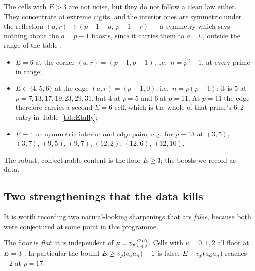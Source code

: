The cells with $E>3$ are not noise, but they do not follow a clean law either. They
concentrate at extreme digits, and the interior ones are symmetric under the reflection
$(a,r)\mapsto(p-1-a,\,p-1-r)$ --- a symmetry which says nothing about the $a=p-1$ boosts,
since it carries them to $a=0$, outside the range of the table :
\begin{itemize}[leftmargin=1.4em]
\item $E=6$ at the corner $(a,r)=(p-1,p-1)$, i.e.\ $n=p^2-1$, at every prime in range;
\item $E\in\{4,5,6\}$ at the edge $(a,r)=(p-1,0)$, i.e.\ $n=p(p-1)$: it is $5$ at
$p=7,13,17,19,23,29,31$, but $4$ at $p=5$ and $6$ at $p=11$. At $p=11$ the edge therefore
carries a second $E=6$ cell, which is the whole of that prime's $6{:}2$ entry in
Table~\ref{tab:Etally};
\item $E=4$ on symmetric interior and edge pairs, e.g.\ for $p=13$ at
$(3,5)$, $(3,7)$, $(9,5)$, $(9,7)$, $(12,2)$, $(12,6)$, $(12,10)$.
\end{itemize}
The robust, conjecturable content is the floor $E\ge3$; the boosts we record as data.

\subsection{Two strengthenings that the data kills}

It is worth recording two natural-looking sharpenings that are \emph{false}, because both
were conjectured at some point in this programme.

\begin{observation}\label{obs:false1}
The floor is \emph{flat}: it is independent of $\kappa=v_p\binom{2n}{n}$. Cells with
$\kappa=0,1,2$ all floor at $E=3$ . In particular the
bound $E\ge v_p(a_aa_n)+1$ is false: $E-v_p(a_aa_n)$ reaches $-2$ at $p=17$.
\end{observation}

